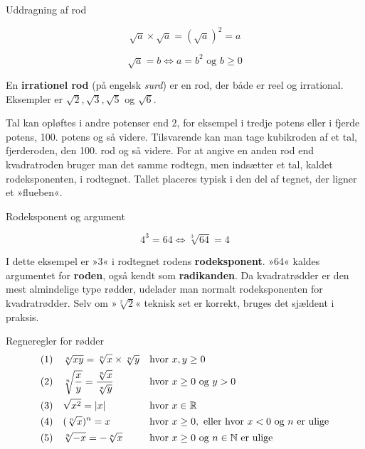 \begin{example} Uddragning af rod

\[
\sqrt{a} \times \sqrt{a} = (\sqrt{a})^2 = a
\]

\[
\sqrt{a} = b \iff a = b^2 \text{ og } b\geq 0
\]    
\end{example}



En \textbf{irrationel rod} (på engelsk \emph{surd}) er en rod, der både er reel og irrational. Eksempler er \(\sqrt{2}, \sqrt{3}, \sqrt{5}\) og \(\sqrt{6}\).

Tal kan opløftes i andre potenser end 2, for eksempel i tredje potens eller i fjerde potens, 100. potens og så videre. Tilsvarende kan man tage kubikroden af et tal, fjerderoden, den 100. rod og så videre. For at angive en anden rod end kvadratroden bruger man det samme rodtegn, men indsætter et tal, kaldet rodeksponenten, i rodtegnet. Tallet placeres typisk i den del af tegnet, der ligner et »flueben«.

\begin{example} Rodeksponent og argument

\[
4^3 = 64 \iff \sqrt[3]{64} = 4
\]
   
\end{example}

I dette eksempel er »3« i rodtegnet rodens \textbf{rodeksponent}. »64« kaldes argumentet for \textbf{roden}, også kendt som \textbf{radikanden}. Da kvadratrødder er den mest almindelige type rødder, udelader man normalt rodeksponenten for kvadratrødder. Selv om »\(\sqrt[2]{2}\)« teknisk set er korrekt, bruges det sjældent i praksis.
\begin{proposition}{Regneregler for rødder}
    \begin{align*}
    &(1) \quad \sqrt[n]{x y}=\sqrt[n]{x} \times \sqrt[n]{y}   &   &\textnormal{hvor } x,y \geq 0\\
    &(2) \quad \sqrt[n]{\frac{x}{y}} = \frac{\sqrt[n]{x}}{\sqrt[n]{y}}    &   &\textnormal{hvor } x \geq 0 \textnormal{ og } y > 0 \\
    &(3) \quad \sqrt{x^2} = |x|   &   &\textnormal{hvor } x \in \mathbb{R} \\
    &(4) \quad (\sqrt[n]{x})^n = x    &   &\textnormal{hvor } x\geq 0, \textnormal{ eller hvor } x<0 \textnormal{ og } n \textnormal{ er ulige}\\
    &(5) \quad \sqrt[n]{-x}=-\sqrt[n]{x}  &   &\textnormal{hvor } x \geq 0 \textnormal{ og } n \in \mathbb{N} \textnormal{ er ulige }
    \end{align*}
\end{proposition}

